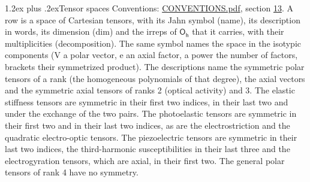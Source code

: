 \documentclass[10pt,a4paper]{article}
\makeatletter
\renewcommand\section{\@startsection{section}{1}{\z@}{-3ex plus -1ex minus -.2ex}%
  {1.2ex plus .2ex}{\normalfont\large\sffamily\bfseries\color{parttitle}}}
\numberwithin{equation}{section}
\newcommand{\grp}[1]{\mathsf{#1}}
\makeatother
\begin{document}
\section{Tensor spaces}\label{s:tensor_spaces}
Conventions: \href{../../CONVENTIONS.pdf}{CONVENTIONS.pdf}, section \href{../../CONVENTIONS.pdf\#conv.13}{13}.
\leavevmode\label{n:head.name}\label{n:head.description}\label{n:head.dim}\label{n:head.decomposition}A row is a space of Cartesian tensors, with its Jahn symbol (name), its description in words, its dimension (dim) and the irreps of $\grp{O_{h}}$ that it carries, with their multiplicities (decomposition). \label{n:label.jahn}The same symbol names the space in the isotypic components (V a polar vector, e an axial factor, a power the number of factors, brackets their symmetrized product). The descriptions name the symmetric polar tensors of a rank (the homogeneous polynomials of that degree), the axial vectors and the symmetric axial tensors of ranks 2 (optical activity) and 3. The elastic stiffness tensors are symmetric in their first two indices, in their last two and under the exchange of the two pairs. The photoelastic tensors are symmetric in their first two and in their last two indices, as are the electrostriction and the quadratic electro-optic tensors. The piezoelectric tensors are symmetric in their last two indices, the third-harmonic susceptibilities in their last three and the electrogyration tensors, which are axial, in their first two. The general polar tensors of rank 4 have no symmetry.
\end{document}
